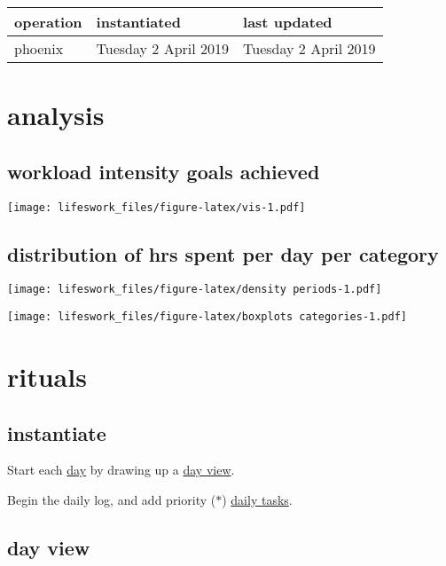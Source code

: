 \documentclass[]{book}
\begin{document}
\begin{longtable}[]{@{}lll@{}}
\toprule
operation & instantiated & last updated\tabularnewline
\midrule
\endhead
phoenix & Tuesday 2 April 2019 & Tuesday 2 April 2019\tabularnewline
\bottomrule
\end{longtable}

\hypertarget{analysis}{%
\chapter{analysis}\label{analysis}}

\hypertarget{workload-intensity-goals-achieved}{%
\section{workload intensity goals achieved}\label{workload-intensity-goals-achieved}}

\texttt{[image: lifeswork\_files/figure-latex/vis-1.pdf]}

\hypertarget{distribution-of-hrs-spent-per-day-per-category}{%
\section{distribution of hrs spent per day per category}\label{distribution-of-hrs-spent-per-day-per-category}}

\texttt{[image: lifeswork\_files/figure-latex/density periods-1.pdf]}

\texttt{[image: lifeswork\_files/figure-latex/boxplots categories-1.pdf]}

\hypertarget{rituals}{%
\chapter{rituals}\label{rituals}}

\hypertarget{instantiate}{%
\section{instantiate}\label{instantiate}}

Start each \href{https://study.com/academy/lesson/german-days-of-the-week.html}{day} by drawing up a \protect\hyperlink{day-view}{day view}.

Begin the daily log, and add priority (\(*\)) \protect\hyperlink{daily-tasks}{daily tasks}.

\hypertarget{day-view}{%
\section{day view}\label{day-view}}
\end{document}
